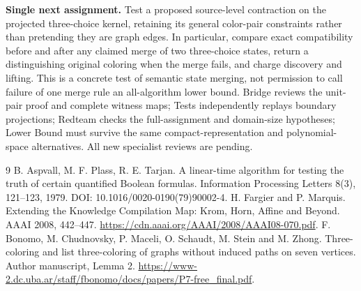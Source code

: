\documentclass[11pt]{article}
\begin{document}
\textbf{Single next assignment.} Test a proposed source-level contraction
on the projected three-choice kernel, retaining its general color-pair
constraints rather than pretending they are graph edges. In particular,
compare exact compatibility before and after any claimed merge of two
three-choice states, return a distinguishing original coloring when the
merge fails, and charge discovery and lifting. This is a concrete test of
semantic state merging, not permission to call failure of one merge rule
an all-algorithm lower bound. Bridge reviews the unit-pair proof and complete
witness maps; Tests independently replays boundary projections; Redteam
checks the full-assignment and domain-size hypotheses; Lower Bound must
survive the same compact-representation and polynomial-space alternatives.
All new specialist reviews are pending.

\begin{thebibliography}{9}
 B. Aspvall, M. F. Plass, R. E. Tarjan.
A linear-time algorithm for testing the truth of certain quantified Boolean
formulas. Information Processing Letters 8(3), 121--123, 1979.
DOI: 10.1016/0020-0190(79)90002-4.
 H. Fargier and P. Marquis.
Extending the Knowledge Compilation Map: Krom, Horn, Affine and Beyond.
AAAI 2008, 442--447. \url{https://cdn.aaai.org/AAAI/2008/AAAI08-070.pdf}.
 F. Bonomo, M. Chudnovsky, P. Maceli, O. Schaudt,
M. Stein and M. Zhong. Three-coloring and list three-coloring of graphs
without induced paths on seven vertices. Author manuscript, Lemma 2.
\url{https://www-2.dc.uba.ar/staff/fbonomo/docs/papers/P7-free_final.pdf}.
\end{thebibliography}
\end{document}
